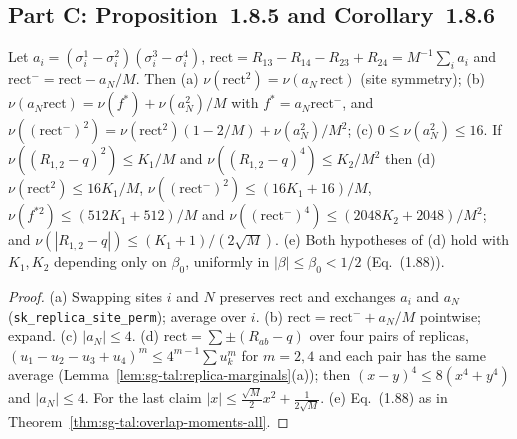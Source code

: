 \subsection{Part C: Proposition~1.8.5 and Corollary~1.8.6}

\begin{lemma}
\label{lem:sg-tal:rect-structure}
  \leanok
{}
Let $a_i=(\sigma^1_i-\sigma^2_i)(\sigma^3_i-\sigma^4_i)$, $\mathrm{rect}=R_{13}-R_{14}-R_{23}+R_{24}=M^{-1}\sum_ia_i$ and $\mathrm{rect}^-=\mathrm{rect}-a_N/M$.  Then (a) $\nu(\mathrm{rect}^2)=\nu(a_N\,\mathrm{rect})$ (site symmetry); (b) $\nu(a_N\mathrm{rect})=\nu(f^*)+\nu(a_N^2)/M$ with $f^*=a_N\mathrm{rect}^-$, and $\nu((\mathrm{rect}^-)^2)=\nu(\mathrm{rect}^2)(1-2/M)+\nu(a_N^2)/M^2$; (c) $0\le\nu(a_N^2)\le16$.  If $\nu((R_{1,2}-q)^2)\le K_1/M$ and $\nu((R_{1,2}-q)^4)\le K_2/M^2$ then (d) $\nu(\mathrm{rect}^2)\le16K_1/M$, $\nu((\mathrm{rect}^-)^2)\le(16K_1+16)/M$, $\nu(f^{*2})\le(512K_1+512)/M$ and $\nu((\mathrm{rect}^-)^4)\le(2048K_2+2048)/M^2$; and $\nu(|R_{1,2}-q|)\le(K_1+1)/(2\sqrt M)$.  (e) Both hypotheses of (d) hold with $K_1,K_2$ depending only on $\beta_0$, uniformly in $|\beta|\le\beta_0<1/2$ (Eq.~(1.88)).
\end{lemma}
\begin{proof}
  \leanok
(a) Swapping sites $i$ and $N$ preserves $\mathrm{rect}$ and exchanges $a_i$ and $a_N$ (\texttt{sk\_replica\_site\_perm}); average over $i$.  (b) $\mathrm{rect}=\mathrm{rect}^-+a_N/M$ pointwise; expand.  (c) $|a_N|\le4$.  (d) $\mathrm{rect}=\sum\pm(R_{ab}-q)$ over four pairs of replicas, $(u_1-u_2-u_3+u_4)^m\le4^{m-1}\sum u_k^m$ for $m=2,4$ and each pair has the same average (Lemma~\ref{lem:sg-tal:replica-marginals}(a)); then $(x-y)^4\le8(x^4+y^4)$ and $|a_N|\le4$.  For the last claim $|x|\le\frac{\sqrt M}2x^2+\frac1{2\sqrt M}$.  (e) Eq.~(1.88) as in Theorem~\ref{thm:sg-tal:overlap-moments-all}.
\end{proof}

